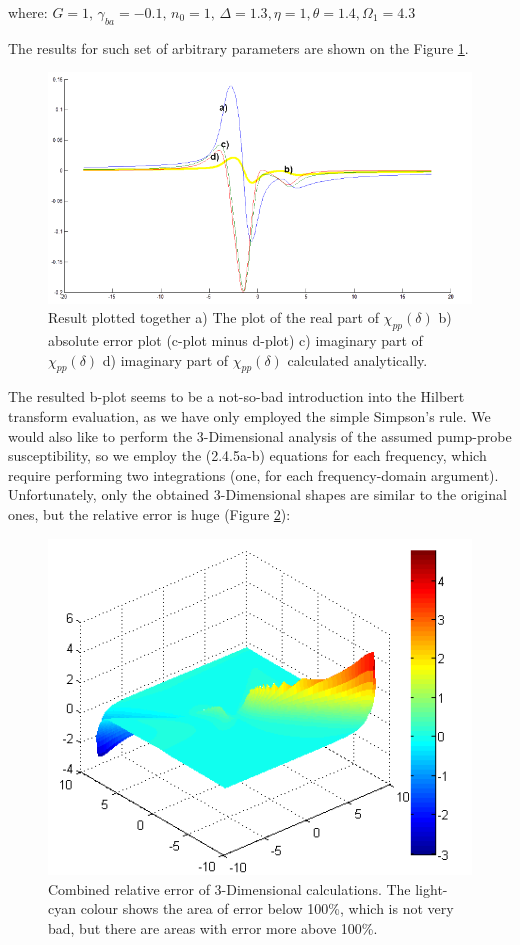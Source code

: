 \documentclass[12pt,twoside,a4paper]{article}
\numberwithin{equation}{subsection}
\numberwithin{figure}{subsection}
\begin{document}
where: $G = 1,\,{\gamma_{ba}} = -0.1,\, {n_{0}} = 1,\,\Delta = 1.3,\eta = 1, \theta = 1.4, \Omega_{1} = 4.3$

The results for such set of arbitrary parameters are shown on the Figure \ref{fig:htran_pnp_2d}.

\begin{figure}
  \includegraphics[width=150mm]{img/htran_pnp_2d.png}
  \caption{Result plotted together 
    a) The plot of the real part of $\chi_{pp} (\delta )$ 
    b) absolute error plot (c-plot minus d-plot) 
    c) imaginary part of $\chi_{pp} (\delta )$
    d) imaginary part of ${\chi_{pp}}(\delta )$ calculated analytically.
    \label{fig:htran_pnp_2d}}
\end{figure}

The resulted b-plot seems to be a not-so-bad introduction into the Hilbert transform evaluation, as we have only employed the
simple Simpson's rule. We would also like to perform the 3-Dimensional analysis of the assumed pump-probe susceptibility, so we
employ the (2.4.5a-b) equations for each frequency, which require performing two integrations (one, for each frequency-domain
argument). Unfortunately, only the obtained 3-Dimensional shapes are similar to the original ones, but the relative error is huge
(Figure \ref{fig:htran_pnp_3derr}):

\begin{figure}
  \includegraphics{img/htran_pnp_3derr.png}
  \caption{Combined relative error of 3-Dimensional calculations. The light-cyan colour shows the area of error below 100\%, which is
  not very bad, but there are areas with error more above 100\%. \label{fig:htran_pnp_3derr}}
\end{figure}
\end{document}
